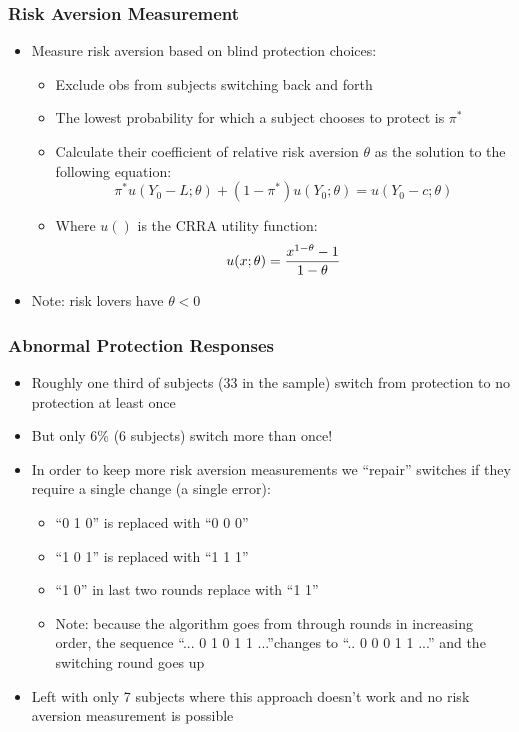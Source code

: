 \documentclass[11pt,hyperref={bookmarks=false}]{beamer}
\begin{document}
\fi


\begin{frame}
\frametitle{Risk Aversion Measurement}
\begin{itemize}
\item Measure risk aversion based on blind protection choices:
\begin{itemize}
\item Exclude obs from subjects switching back and forth
\item The lowest probability for which a subject chooses to protect is $\pi^*$
\item Calculate their coefficient of relative risk aversion $\theta$ as the solution to the following equation:
$$\pi^* u(Y_0-L;\theta)+(1-\pi^*)u(Y_0;\theta)=u(Y_0-c;\theta)$$
\item Where  $u()$ is the CRRA utility function:
$$u(x;\theta)={x^{1-\theta} -1 \over 1-\theta}$$
\end{itemize}
\item Note: risk lovers have $\theta<0$
\end{itemize}
\end{frame}


\begin{frame}
\frametitle{Abnormal Protection Responses}
\begin{itemize}
\item Roughly one third of subjects (33 in the sample) switch from protection to no protection at least once
\item But only 6\% (6 subjects) switch more than once!
\item In order to keep more risk aversion measurements we ``repair'' switches if they require a single change (a single error):
\begin{itemize}
\item ``0 1 0'' is replaced with ``0 0 0''
\item ``1 0 1'' is replaced with ``1 1 1''
\item ``1 0'' in last two rounds replace with ``1 1''
\item Note: because the algorithm goes from through rounds in increasing order, the sequence ``... 0 1 0 1 1 ...''changes to ``.. 0 0 0 1 1 ...'' and the switching round goes up 
\end{itemize}
\item Left with only 7 subjects where this approach doesn't work and no risk aversion measurement is possible
\end{itemize}
\end{frame}
\end{document}
